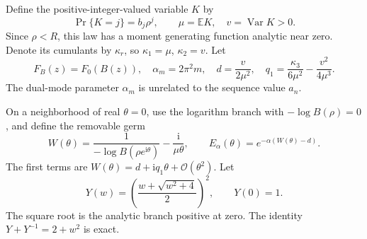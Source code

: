 \documentclass[11pt]{article}
\theoremstyle{definition}\newtheorem{definition}[theorem]{Definition}
\theoremstyle{remark}\newtheorem{remark}[theorem]{Remark}
\newcommand{\OO}{\mathcal O}
\newcommand{\EE}{\mathbb E}
\newcommand{\Var}{\operatorname{Var}}
\newcommand{\ii}{\mathrm i}
\begin{document}
Define the positive-integer-valued variable $K$ by
\begin{equation}\label{dep:eta:eq:law}
 \Pr\{K=j\}=b_j\rho^j,
 \qquad \mu=\EE K,\quad v=\Var K>0.
\end{equation}
Since $\rho<R$, this law has a moment generating function analytic
near zero. Denote its cumulants by $\kappa_r$, so
$\kappa_1=\mu$, $\kappa_2=v$. Let
\begin{equation}\label{dep:eta:eq:modes}
 F_B(z)=F_0(B(z)),\quad \alpha_m=2\pi^2m,
 \quad d=\frac{v}{2\mu^2},\quad
 q_1=\frac{\kappa_3}{6\mu^2}-\frac{v^2}{4\mu^3}.
\end{equation}
The dual-mode parameter $\alpha_m$ is unrelated to the sequence value $a_n$.

On a neighborhood of real $\theta=0$, use the logarithm branch with
$-\log B(\rho)=0$, and define the removable germ
\begin{equation}\label{dep:eta:eq:W}
 W(\theta)=\frac1{-\log B(\rho e^{\ii\theta})}
                  -\frac{\ii}{\mu\theta},
 \qquad E_\alpha(\theta)=e^{-\alpha(W(\theta)-d)}.
\end{equation}
The first terms are $W(\theta)=d+\ii q_1\theta+\OO(\theta^2)$.
Let
\begin{equation}\label{dep:eta:eq:Y}
 Y(w)=\left(\frac{w+\sqrt{w^2+4}}2\right)^2,
 \qquad Y(0)=1.
\end{equation}
The square root is the analytic branch positive at zero. The identity
$Y+Y^{-1}=2+w^2$ is exact.
\end{document}
